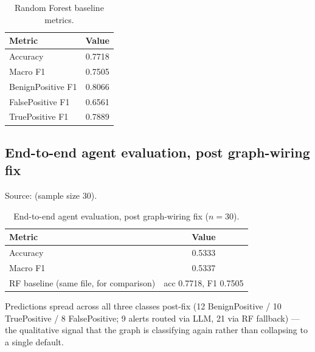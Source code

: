 \documentclass[twocolumn]{svjour3}
\begin{document}
\begin{table}[h]
\caption{Random Forest baseline metrics.}\label{tab3}
\begin{tabular}{@{}lc@{}}
\toprule
Metric & Value \\
\midrule
Accuracy            & 0.7718 \\
Macro F1            & 0.7505 \\
BenignPositive F1    & 0.8066 \\
FalsePositive F1    & 0.6561 \\
TruePositive F1      & 0.7889 \\
\bottomrule
\end{tabular}
\end{table}

\subsection{End-to-end agent evaluation, post graph-wiring fix}\label{subsec4-5}
Source:  (sample size 30).

\begin{table}[h]
\caption{End-to-end agent evaluation, post graph-wiring fix ($n=30$).}\label{tab4}
\begin{tabular}{@{}lc@{}}
\toprule
Metric & Value \\
\midrule
Accuracy & 0.5333 \\
Macro F1 & 0.5337 \\
RF baseline (same file, for comparison) & acc 0.7718, F1 0.7505 \\
\bottomrule
\end{tabular}
\end{table}

Predictions spread across all three classes post-fix (12 BenignPositive / 10 TruePositive / 8 FalsePositive; 9 alerts routed via LLM, 21 via RF fallback) --- the qualitative signal that the graph is classifying again rather than collapsing to a single default.
\end{document}
